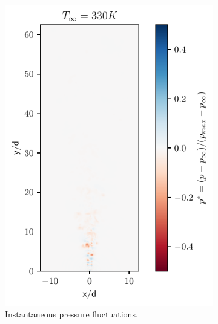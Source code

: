 \begin{figure}[htbp!]
\begin{subfigure}{0.25\textwidth}
	\centering
	\includegraphics[scale=.65]{figures/Plots/vertical/330/pressure_scaled_vert_330.pdf}
	\caption{Instantaneous pressure fluctuations.} \label{330_pressure_1}
\end{subfigure}
\hfill
\begin{subfigure}{0.25\textwidth}
	\centering

\end{subfigure}
\end{figure}
